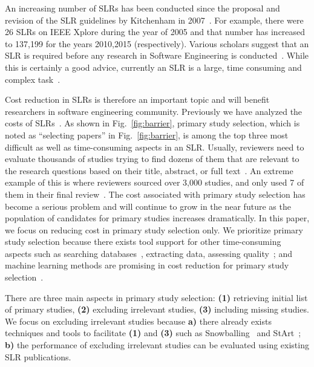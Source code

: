 \documentclass{svjour3}
\theoremstyle{break}
\begin{document}
An increasing number of SLRs has been conducted since the proposal and
revision of the SLR guidelines by Kitchenham in 2007~\cite{keele2007guidelines}. For
example, there were 26 SLRs on IEEE Xplore during the year of 2005 and that
number has increased to 137,199 for the years   2010,2015 (respectively). Various scholars  suggest that an SLR is required before any research in Software
Engineering is conducted~\cite{keele2007guidelines}.
While this is certainly a good advice,
currently an SLR is
a large, time consuming and complex
task~\cite{hassler2016identification,hassler2014outcomes,carver2013identifying,bowes2012slurp}.

Cost reduction in SLRs is therefore an important topic and will benefit researchers in software engineering community.
Previously we have analyzed the costs of SLRs~\cite{hassler2014outcomes,carver2013identifying}. As shown in Fig.~\ref{fig:barrier}, primary study selection, which is noted as ``selecting papers'' in Fig.~\ref{fig:barrier}, is among the top three most difficult
as well as time-consuming aspects in an SLR. Usually, reviewers need to evaluate
thousands of studies trying to find dozens of them that are relevant to the
research questions based on their title, abstract, or full text~\cite{bowes2012slurp}. An extreme
example of this is where reviewers sourced over
3,000 studies, and only used 7 of them in their final review~\cite{bezerra2009systematic}. The cost associated with primary study selection has become a serious problem and will continue to grow in the near future as the population of candidates for primary
studies increases dramatically. In this paper, we focus on reducing cost in primary study selection only. We prioritize primary study selection because there exists tool support for other time-consuming aspects such as searching databases~\cite{Molleri:2015:SWA:2745802.2745825,hernandes2012using}, extracting data\cite{Molleri:2015:SWA:2745802.2745825,hernandes2012using,fernandez2010slr,bowes2012slurp}, assessing quality~\cite{fernandez2010slr,bowes2012slurp,Molleri:2015:SWA:2745802.2745825}; and machine learning methods are promising in cost reduction for primary study selection~\cite{wallace2010semi,grossman2013}.

There are three main aspects in primary study selection: \textbf{(1)} retrieving initial list of primary studies, \textbf{(2)} excluding irrelevant studies, \textbf{(3)} including missing studies. We focus on excluding irrelevant studies because \textbf{a)} there already exists techniques and tools to facilitate \textbf{(1)} and \textbf{(3)} such as Snowballing~\cite{jalali2012systematic} and StArt~\cite{hernandes2012using}; \textbf{b)} the performance of excluding irrelevant studies can be evaluated using existing SLR publications.
\end{document}
